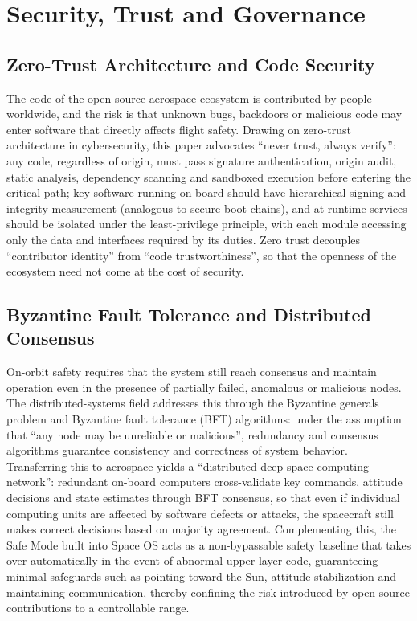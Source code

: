 \documentclass[11pt]{article}
\begin{document}
\section{Security, Trust and Governance}
\subsection{Zero-Trust Architecture and Code Security}
The code of the open-source aerospace ecosystem is contributed by people worldwide, and the risk is that unknown bugs, backdoors or malicious code may enter software that directly affects flight safety. Drawing on zero-trust architecture in cybersecurity, this paper advocates ``never trust, always verify'': any code, regardless of origin, must pass signature authentication, origin audit, static analysis, dependency scanning and sandboxed execution before entering the critical path; key software running on board should have hierarchical signing and integrity measurement (analogous to secure boot chains), and at runtime services should be isolated under the least-privilege principle, with each module accessing only the data and interfaces required by its duties. Zero trust decouples ``contributor identity'' from ``code trustworthiness'', so that the openness of the ecosystem need not come at the cost of security.

\subsection{Byzantine Fault Tolerance and Distributed Consensus}
On-orbit safety requires that the system still reach consensus and maintain operation even in the presence of partially failed, anomalous or malicious nodes. The distributed-systems field addresses this through the Byzantine generals problem and Byzantine fault tolerance (BFT) algorithms: under the assumption that ``any node may be unreliable or malicious'', redundancy and consensus algorithms guarantee consistency and correctness of system behavior. Transferring this to aerospace yields a ``distributed deep-space computing network'': redundant on-board computers cross-validate key commands, attitude decisions and state estimates through BFT consensus, so that even if individual computing units are affected by software defects or attacks, the spacecraft still makes correct decisions based on majority agreement. Complementing this, the Safe Mode built into Space OS acts as a non-bypassable safety baseline that takes over automatically in the event of abnormal upper-layer code, guaranteeing minimal safeguards such as pointing toward the Sun, attitude stabilization and maintaining communication, thereby confining the risk introduced by open-source contributions to a controllable range.
\end{document}
